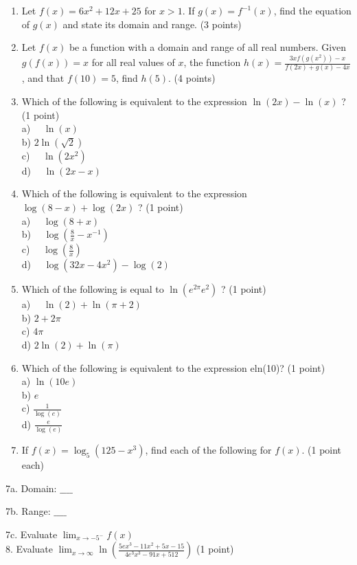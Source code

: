 \documentclass[10pt]{article}
\begin{document}
\begin{enumerate}
  \item Let $f(x)=6 x^{2}+12 x+25$ for $x>1$. If $g(x)=f^{-1}(x)$, find the equation of $g(x)$ and state its domain and range. (3 points)
  \item Let $f(x)$ be a function with a domain and range of all real numbers. Given $g(f(x))=x$ for all real values of $x$, the function $h(x)=\frac{3 x f\left(g\left(x^{2}\right)\right)-x}{f(2 x)+g(x)-4 x}$, and that $f(10)=5$, find $h(5)$. (4 points)
  \item Which of the following is equivalent to the expression $\ln (2 x)-\ln (x)$ ? (1 point)\\
a) $\quad \ln (x)$\\
b) $2 \ln (\sqrt{2})$\\
c) $\quad \ln \left(2 x^{2}\right)$\\
d) $\quad \ln (2 x-x)$
  \item Which of the following is equivalent to the expression $\log (8-x)+\log (2 x)$ ? (1 point)\\
a) $\quad \log (8+x)$\\
b) $\quad \log \left(\frac{8}{x}-x^{-1}\right)$\\
c) $\quad \log \left(\frac{8}{x}\right)$\\
d) $\quad \log \left(32 x-4 x^{2}\right)-\log (2)$
  \item Which of the following is equal to $\ln \left(e^{2 \pi} e^{2}\right)$ ? (1 point)\\
a) $\quad \ln (2)+\ln (\pi+2)$\\
b) $2+2 \pi$\\
c) $4 \pi$\\
d) $2 \ln (2)+\ln (\pi)$
  \item Which of the following is equivalent to the expression eln(10)? (1 point)\\
a) $\ln (10 e)$\\
b) $e$\\
c) $\frac{1}{\log (e)}$\\
d) $\frac{e}{\log (e)}$
  \item If $f(x)=\log _{5}\left(125-x^{3}\right)$, find each of the following for $f(x)$. (1 point each)
\end{enumerate}

7a. Domain: $\_\_\_\_$

7b. Range: $\_\_\_\_$

7c. Evaluate $\lim _{x \rightarrow-5^{-}} f(x)$\\
8. Evaluate $\lim _{x \rightarrow \infty} \ln \left(\frac{5 e x^{3}-11 x^{2}+5 x-15}{4 e^{3} x^{3}-91 x+512}\right)$ (1 point)
\end{document}
